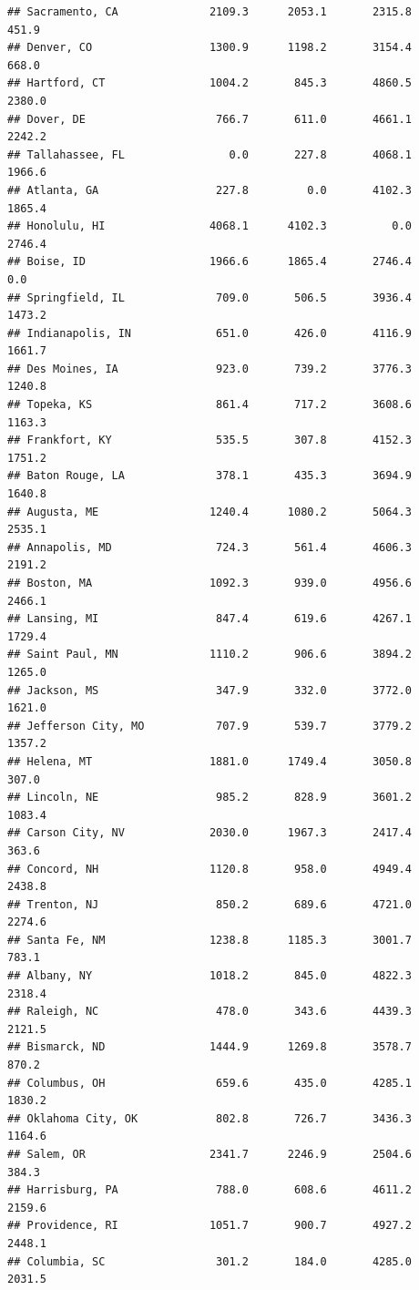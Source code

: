 \documentclass[
]{article}
\begin{document}
\begin{verbatim}
## Sacramento, CA              2109.3      2053.1       2315.8     451.9
## Denver, CO                  1300.9      1198.2       3154.4     668.0
## Hartford, CT                1004.2       845.3       4860.5    2380.0
## Dover, DE                    766.7       611.0       4661.1    2242.2
## Tallahassee, FL                0.0       227.8       4068.1    1966.6
## Atlanta, GA                  227.8         0.0       4102.3    1865.4
## Honolulu, HI                4068.1      4102.3          0.0    2746.4
## Boise, ID                   1966.6      1865.4       2746.4       0.0
## Springfield, IL              709.0       506.5       3936.4    1473.2
## Indianapolis, IN             651.0       426.0       4116.9    1661.7
## Des Moines, IA               923.0       739.2       3776.3    1240.8
## Topeka, KS                   861.4       717.2       3608.6    1163.3
## Frankfort, KY                535.5       307.8       4152.3    1751.2
## Baton Rouge, LA              378.1       435.3       3694.9    1640.8
## Augusta, ME                 1240.4      1080.2       5064.3    2535.1
## Annapolis, MD                724.3       561.4       4606.3    2191.2
## Boston, MA                  1092.3       939.0       4956.6    2466.1
## Lansing, MI                  847.4       619.6       4267.1    1729.4
## Saint Paul, MN              1110.2       906.6       3894.2    1265.0
## Jackson, MS                  347.9       332.0       3772.0    1621.0
## Jefferson City, MO           707.9       539.7       3779.2    1357.2
## Helena, MT                  1881.0      1749.4       3050.8     307.0
## Lincoln, NE                  985.2       828.9       3601.2    1083.4
## Carson City, NV             2030.0      1967.3       2417.4     363.6
## Concord, NH                 1120.8       958.0       4949.4    2438.8
## Trenton, NJ                  850.2       689.6       4721.0    2274.6
## Santa Fe, NM                1238.8      1185.3       3001.7     783.1
## Albany, NY                  1018.2       845.0       4822.3    2318.4
## Raleigh, NC                  478.0       343.6       4439.3    2121.5
## Bismarck, ND                1444.9      1269.8       3578.7     870.2
## Columbus, OH                 659.6       435.0       4285.1    1830.2
## Oklahoma City, OK            802.8       726.7       3436.3    1164.6
## Salem, OR                   2341.7      2246.9       2504.6     384.3
## Harrisburg, PA               788.0       608.6       4611.2    2159.6
## Providence, RI              1051.7       900.7       4927.2    2448.1
## Columbia, SC                 301.2       184.0       4285.0    2031.5

\end{verbatim}
\end{document}
